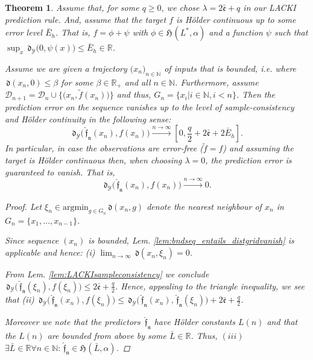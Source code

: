 \documentclass{article} %
\newtheorem{thm}{Theorem}[section]
\theoremstyle{definition}
\theoremstyle{remark}
\newcommand{\Real}{\mathbb R}
\newcommand{\nat}{\mathbb N}
\newcommand{\argmin}{\text{argmin}}
\newcommand{\data}{\ensuremath{ \mathcal D} }
\newcommand{\outspace}{\ensuremath{ \mathcal Y}}
\newcommand{\grid}{\ensuremath{  G}}
\newcommand{\metric}{\, \mathfrak{d}} %
\newcommand{\predfn}{\, \mathfrak{  \hat f_n}} %
\newcommand{\hexp}{{ \alpha }}%
\newcommand{\hestthresh}{\ensuremath{ \lambda}}
\newcommand{\hoelset}[3]{\mathfrak{H}_{#2}(#1,#3)}
\newcommand{\obserrbnd}{\bar{\mathfrak e}}
\newcommand{\seq}[2]{\ensuremath{\bigl(#1\bigr)_{#2}}}
\begin{document}
\begin{thm}
Assume that, for some $q\geq0$, we chose $\hestthresh = 2 \obserrbnd + q$ in our LACKI prediction rule. And, assume that the target $f$ is H\"older continuous up to some error level $\bar E_h$. That is, $f = \phi + \psi$ with $\phi \in \hoelset {L^*} { } \hexp$ and a function $\psi$ such that $\sup_x \metric_\outspace\bigl(0,\psi(x)\bigr) \leq \bar E_h \in \Real$.

Assume we are given a trajectory $\seq{x_n}{n \in \nat}$ of inputs that is bounded, i.e. where 
$\metric(x_n,0) \leq \beta$ for some $\beta \in \Real_+$ and all $n \in \nat$.
Furthermore, assume $\data_{n+1} = \data_n \cup \{ \bigl(x_n, \tilde f(x_n)\bigr) \}$ and thus, $\grid_n = \{ x_i | i \in \nat, i < n\}$.
Then the prediction error on the sequence vanishes up to the level of sample-consistency and H\"older continuity in the following sense:
 \[\metric_\outspace\bigl(\predfn(x_n),f(x_n) \bigr) \stackrel{n \to \infty}{\longrightarrow} [0,\frac q 2 + 2  \obserrbnd  + 2 \bar E_h].\]
In particular, in case the observations are error-free ($\tilde f = f$) and assuming the target is H\"older continuous then, when choosing $\hestthresh = 0$, the prediction error is guaranteed to vanish. That is,
\[\metric_\outspace\bigl(\predfn(x_n),f(x_n) \bigr) \stackrel{n \to \infty}{\longrightarrow}0.\]

\begin{proof}

Let $\xi_n  \in \argmin_{g \in \grid_n} \metric(x_n,g)$ denote the nearest neighbour of $x_n$ in $\grid_n = \{x_1,...,x_{n-1}\}$.

Since sequence $(x_n)$ is bounded, Lem. \ref{lem:bndseq_entails_distgridvanish} is applicable and hence: (i) $\lim_{n \to \infty} \metric (x_n,\xi_n) = 0$.

From Lem. \ref{lem:LACKIsampleconsistency} we conclude 
$\metric_\outspace\bigl(\predfn(\xi_n) ,  f(\xi_n)  \bigr) \leq 2\obserrbnd +  \frac q 2$. Hence, appealing to the triangle inequality, we see that 
(ii) $\metric_\outspace\bigl(\predfn(x_n) ,  f(\xi_n)  \bigr) \leq \metric_\outspace\bigl(\predfn(x_n) ,  \predfn(\xi_n) \bigr) + 2 \obserrbnd + \frac q 2$.



Moreover we note that the predictors $\predfn$ have H\"older constants $L(n)$ and that the $L(n)$ are bounded from above by some $\bar L \in \Real$. Thus,  $(iii)$ $\exists \bar L \in \Real\forall n \in \nat : \predfn \in \hoelset {\bar L} { } \hexp$. 
  

\end{proof}
\end{thm}
\end{document}
